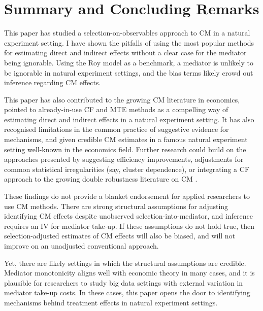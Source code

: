 \section{Summary and Concluding Remarks}
\label{sec:conclusion}
This paper has studied a selection-on-observables approach to CM in a natural experiment setting.
I have shown the pitfalls of using the most popular methods for estimating direct and indirect effects without a clear case for the mediator being ignorable.
Using the Roy model as a benchmark, a mediator is unlikely to be ignorable in natural experiment settings, and the bias terms likely crowd out inference regarding CM effects.

This paper has also contributed to the growing CM literature in economics, pointed to already-in-use CF and MTE methods as a compelling way of estimating direct and indirect effects in a natural experiment setting.
It has also recognised limitations in the common practice of suggestive evidence for mechanisms, and given credible CM estimates in a famous natural experiment setting well-known in the economics field.
Further research could build on the approaches presented by suggesting efficiency improvements, adjustments for common statistical irregularities (say, cluster dependence), or integrating a CF approach to the growing double robustness literature on CM \citep{farbmacher2022causal,bia2024double}.

These findings do not provide a blanket endorsement for applied researchers to use CM methods.
There are strong structural assumptions for adjusting identifying CM effects despite unobserved selection-into-mediator, and inference requires an IV for mediator take-up.
If these assumptions do not hold true, then selection-adjusted estimates of CM effects will also be biased, and will not improve on an unadjusted conventional approach.

Yet, there are likely settings in which the structural assumptions are credible.
Mediator monotonicity aligns well with economic theory in many cases, and it is plausible for researchers to study big data settings with external variation in mediator take-up costs.
In these cases, this paper opens the door to identifying mechanisms behind treatment effects in natural experiment settings.
